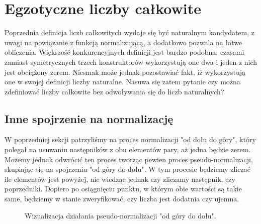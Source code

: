 \section{Egzotyczne liczby całkowite}
Poprzednia definicja liczb całkowitych wydaje się być naturalnym kandydatem, z uwagi na powiązanie z funkcją normalizującą, a dodatkowo pozwala na łatwe obliczenia. Większość konkurencyjnych definicji jest bardzo podobna, czasami zamiast symetrycznych trzech konstruktorów wykorzystują one dwa i jeden z nich jest obciążony zerem. Niesmak może jednak pozostawiać fakt, iż wykorzystują one w swojej definicji liczby naturalne. Nasuwa się zatem pytanie czy można zdefiniować liczby całkowite bez odwoływania się do liczb naturalnych?
\subsection{Inne spojrzenie na normalizację}
W poprzedniej sekcji patrzyliśmy na proces normalizacji "od dołu do góry", który polegał na usuwaniu następników z obu elementów pary, aż jedna będzie zerem. Możemy jednak odwrócić ten proces tworząc pewien proces pseudo-normalizacji, skupiając się na spojrzeniu "od góry do dołu". W tym procesie będziemy zliczać ile elementów jest powyżej, nie wiedząc jednak czy zliczamy następnik, czy poprzedniki. Dopiero po osiągnięciu punktu, w którym obie wartości są takie same, będziemy w stanie zweryfikować, czy liczba jest dodatnia czy ujemna. 
\begin{figure}[!htp]
    \centering

    \hspace{1cm}

    \caption{Wizualizacja działania pseudo-normalizacji "od góry do dołu".}
    \label{fig:int_psudonorm}
\end{figure}
